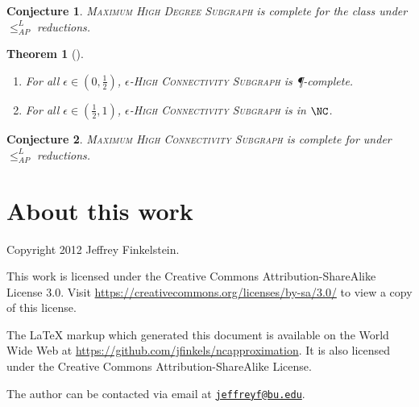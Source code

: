 \documentclass[]{article}
\theoremstyle{plain}
\newtheorem{conjecture}{Conjecture}
\newtheorem{theorem}{Theorem}
\theoremstyle{definition}
\newcommand{\APr}{\leq_{AP}^{L}}
\newcommand{\email}[1]{\href{mailto:#1}{\nolinkurl{#1}}}
\begin{document}
\begin{conjecture}
  \textsc{Maximum High Degree Subgraph} is complete for the class \ApxNCOp{} under $\APr$ reductions.
\end{conjecture}

\begin{theorem}[{\cite[{Theorem~6}]{ss89}}]
  \mbox{}
  \begin{enumerate}
  \item For all $\epsilon \in (0, \frac{1}{2})$, \textsc{$\epsilon$-High Connectivity Subgraph} is \P-complete.
  \item For all $\epsilon \in (\frac{1}{2}, 1)$, \textsc{$\epsilon$-High Connectivity Subgraph} is in $\NC$.
  \end{enumerate}
\end{theorem}

\begin{conjecture}
  \textsc{Maximum High Connectivity Subgraph} is complete for \ApxNCO{} under $\APr$ reductions.
\end{conjecture}

\section{About this work}

Copyright 2012 Jef{}frey Finkelstein.

This work is licensed under the Creative Commons Attribution-ShareAlike License 3.0.
Visit \mbox{\url{https://creativecommons.org/licenses/by-sa/3.0/}} to view a copy of this license.

The \LaTeX{} markup which generated this document is available on the World Wide Web at \mbox{\url{https://github.com/jfinkels/ncapproximation}}.
It is also licensed under the Creative Commons Attribution-ShareAlike License.

The author can be contacted via email at \email{jeffreyf@bu.edu}.



\end{document}
